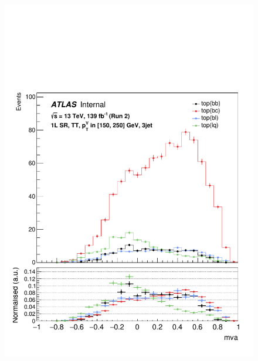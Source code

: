 \begin{figure}[h!]
\includegraphics[scale=0.253]{Images/VH/top/OneLepton_top_2tttag3jet_SR_150_250ptv_mva.pdf} \\


\end{figure}
